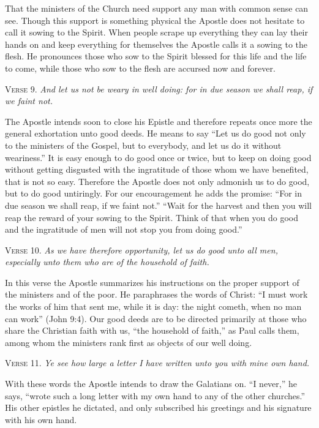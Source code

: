 That the ministers of the Church need support any man with common sense can see. Though this support is something physical the Apostle does not hesitate to call it sowing to the Spirit. When people scrape up everything they can lay their hands on and keep everything for themselves the Apostle calls it a sowing to the flesh. He pronounces those who sow to the Spirit blessed for this life and the life to come, while those who sow to the flesh are accursed now and forever.

\textsc{Verse} 9. \emph{And let us not be weary in well doing: for in due season we shall reap, if we faint not.}

The Apostle intends soon to close his Epistle and therefore repeats once more the general exhortation unto good deeds. He means to say “Let us do good not only to the ministers of the Gospel, but to everybody, and let us do it without weariness.” It is easy enough to do good once or twice, but to keep on doing good without getting disgusted with the ingratitude of those whom we have benefited, that is not so easy. Therefore the Apostle does not only admonish us to do good, but to do good untiringly. For our encouragement he adds the promise: “For in due season we shall reap, if we faint not.” “Wait for the harvest and then you will reap the reward of your sowing to the Spirit. Think of that when you do good and the ingratitude of men will not stop you from doing good.”

\textsc{Verse} 10. \emph{As we have therefore opportunity, let us do good unto all men, especially unto them who are of the household of faith.}

In this verse the Apostle summarizes his instructions on the proper support of the ministers and of the poor. He paraphrases the words of Christ: “I must work the works of him that sent me, while it is day: the night cometh, when no man can work” (John 9:4). Our good deeds are to be directed primarily at those who share the Christian faith with us, “the household of faith,” as Paul calls them, among whom the ministers rank first as objects of our well doing.

\textsc{Verse} 11. \emph{Ye see how large a letter I have written unto you with mine own hand.}

With these words the Apostle intends to draw the Galatians on. “I never,” he says, “wrote such a long letter with my own hand to any of the other churches.” His other epistles he dictated, and only subscribed his greetings and his signature with his own hand.


